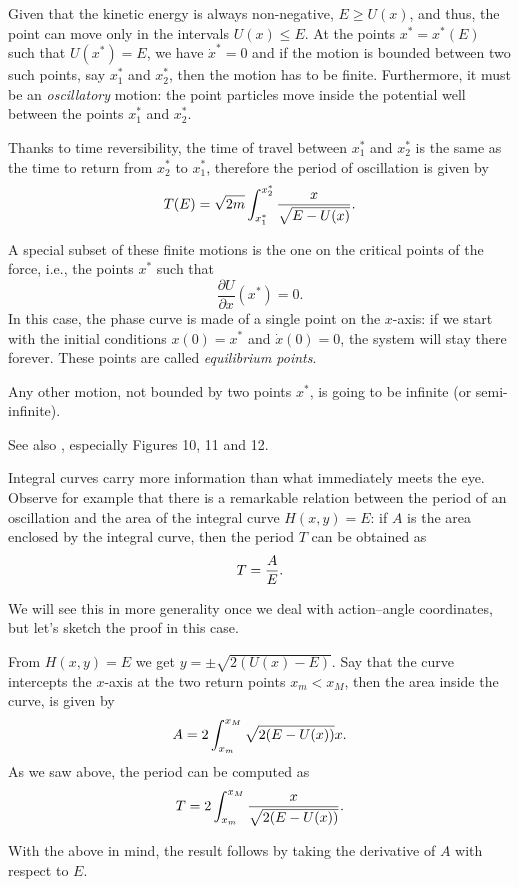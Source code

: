 \documentclass[english,fontsize=11pt,paper=a5,oneside]{scrbook}
\let\d\relax
\DeclareMathOperator{\d}{d}
\theoremstyle{definition}
\newenvironment{remark}
  {\pushQED{\qed}\renewcommand{\qedsymbol}{$\lozenge$}\remarkx}
  {\popQED\endremarkx}
\begin{document}
Given that the kinetic energy is always non-negative, $E \geq U(x)$, and thus, the point can move only in the intervals $U(x) \leq E$.
At the points $x^* = x^*(E)$ such that $U(x^*) = E$, we have $\dot x^* = 0$ and if the motion is bounded between two such points, say $x_1^*$ and $x_2^*$, then the motion has to be finite.
Furthermore, it must be an \emph{oscillatory} motion: the point particles move inside the potential well between the points $x_1^*$ and $x_2^*$.

Thanks to time reversibility, the time of travel between $x_1^*$ and $x_2^*$ is the same as the time to return from $x_2^*$ to $x_1^*$, therefore the period of oscillation is given by
\begin{equation}\label{eq:osc}
    T(E) = \sqrt{2m} \int_{x^*_1}^{x^*_2} \frac{\d x}{\sqrt{E-U(x)}}.
\end{equation}

A special subset of these finite motions is the one on the critical points of the force, i.e., the points $x^*$ such that 
\begin{equation}
    \frac{\partial U}{\partial x}(x^*) = 0.
\end{equation}
In this case, the phase curve is made of a single point on the $x$-axis: if we start with the initial conditions $x(0) = x^*$ and $\dot x(0) = 0$, the system will stay there forever. These points are called \emph{equilibrium points}.

Any other motion, not bounded by two points $x^*$, is going to be infinite (or semi-infinite).

See also \cite[Chapter 2.4]{book:arnold}, especially Figures 10, 11 and 12.

\begin{remark}
    Integral curves carry more information than what immediately meets the eye.
    Observe for example that there is a remarkable relation between the period of an oscillation and the area of the integral curve $H(x,y) = E$:
    if $A$ is the area enclosed by the integral curve, then the period $T$ can be obtained as
    \begin{equation}
        T = \frac{\d A}{\d E}.
    \end{equation}
    
    We will see this in more generality once we deal with action--angle coordinates, but let's sketch the proof in this case.
    
    From $H(x,y) = E$ we get $y = \pm \sqrt{2(U(x) - E)}$. Say that the curve intercepts the $x$-axis at the two return points $x_m < x_M$, then the area inside the curve, is given by
    \begin{equation}
        A = 2\int_{x_m}^{x_M}\sqrt{2(E - U(x))} \d x.
    \end{equation}
    As we saw above, the period can be computed as
    \begin{equation}
        T = 2\int_{x_m}^{x_M} \frac{\d x}{\sqrt{2(E - U(x))}}.
    \end{equation}
    
    With the above in mind, the result follows by taking the derivative of $A$ with respect to $E$.
\end{remark}
\end{document}
